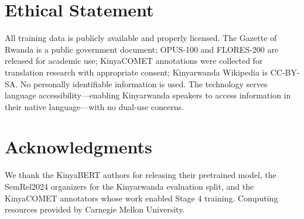 \documentclass[letterpaper]{article} %
\begin{document}
\section*{Ethical Statement}

All training data is publicly available and properly licensed. The Gazette of
Rwanda is a public government document; OPUS-100 and FLORES-200 are released
for academic use; KinyaCOMET annotations were collected for translation
research with appropriate consent; Kinyarwanda Wikipedia is CC-BY-SA. No
personally identifiable information is used. The technology serves language
accessibility---enabling Kinyarwanda speakers to access information in their
native language---with no dual-use concerns.

\section*{Acknowledgments}

We thank the KinyaBERT authors for releasing their pretrained model, the
SemRel2024 organizers for the Kinyarwanda evaluation split, and the
KinyaCOMET annotators whose work enabled Stage 4 training. Computing resources
provided by Carnegie Mellon University.


\end{document}
